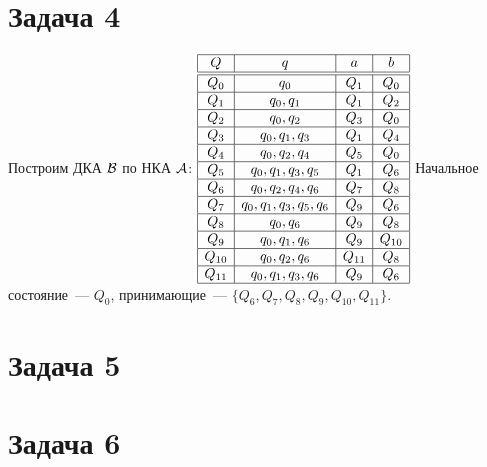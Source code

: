 \documentclass[a4paper]{article}
\def\A{{\cal A}}
\def\B{{\cal B}}
\begin{document}
\section*{Задача 4}
Построим ДКА $\B$ по НКА $\A$:\newline
$\begin{array}{|c|c|c|c|}
\hline
Q & q & a & b\\\hline\hline
Q_0 & q_0						& Q_1  & Q_0 \\\hline
Q_1 & q_0, q_1					& Q_1  & Q_2 \\\hline
Q_2 & q_0, q_2					& Q_3  & Q_0 \\\hline
Q_3 & q_0, q_1, q_3				& Q_1  & Q_4 \\\hline
Q_4 & q_0, q_2, q_4				& Q_5  & Q_0 \\\hline
Q_5 & q_0, q_1, q_3, q_5		& Q_1  & Q_6 \\\hline
Q_6 & q_0, q_2, q_4, q_6		& Q_7  & Q_8 \\\hline
Q_7 & q_0, q_1, q_3, q_5, q_6	& Q_9  & Q_6 \\\hline
Q_8 & q_0, q_6					& Q_9  & Q_8 \\\hline
Q_9 & q_0, q_1, q_6				& Q_9  & Q_{10}\\\hline
Q_{10} & q_0, q_2, q_6				& Q_{11} & Q_8 \\\hline
Q_{11} & q_0, q_1, q_3, q_6		& Q_9  & Q_6 \\\hline
\end{array}$
\newline
Начальное состояние~--- $Q_0$, принимающие~--- $\{Q_6, Q_7, Q_8, Q_9, Q_{10}, Q_{11}\}$.
\section*{Задача 5}
\section*{Задача 6}
\end{document}
